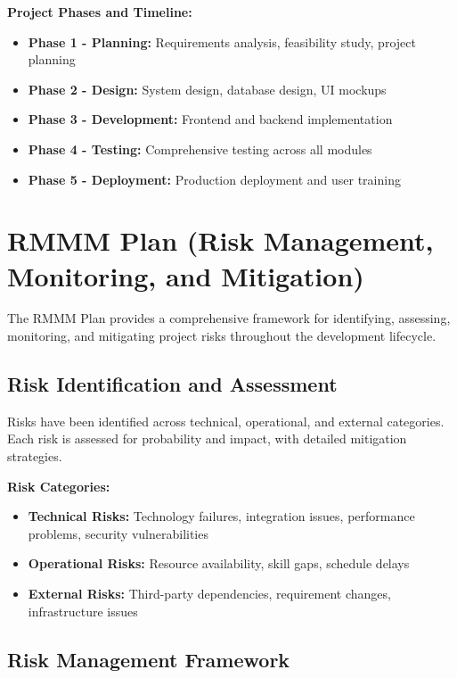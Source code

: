 \textbf{Project Phases and Timeline:}
\begin{itemize}[leftmargin=*]
    \item \textbf{Phase 1 - Planning:} Requirements analysis, feasibility study, project planning
    \item \textbf{Phase 2 - Design:} System design, database design, UI mockups
    \item \textbf{Phase 3 - Development:} Frontend and backend implementation
    \item \textbf{Phase 4 - Testing:} Comprehensive testing across all modules
    \item \textbf{Phase 5 - Deployment:} Production deployment and user training
\end{itemize}

\section{RMMM Plan (Risk Management, Monitoring, and Mitigation)}

The RMMM Plan provides a comprehensive framework for identifying, assessing, monitoring, and mitigating project risks throughout the development lifecycle.

\subsection{Risk Identification and Assessment}

Risks have been identified across technical, operational, and external categories. Each risk is assessed for probability and impact, with detailed mitigation strategies.

\textbf{Risk Categories:}
\begin{itemize}[leftmargin=*]
    \item \textbf{Technical Risks:} Technology failures, integration issues, performance problems, security vulnerabilities
    \item \textbf{Operational Risks:} Resource availability, skill gaps, schedule delays
    \item \textbf{External Risks:} Third-party dependencies, requirement changes, infrastructure issues
\end{itemize}

\subsection{Risk Management Framework}

